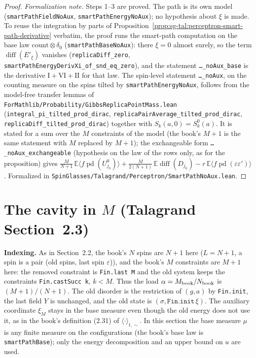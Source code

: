 \begin{proof}
\emph{Formalization note.} Steps 1--3 are proved. The path is its own model (\texttt{smartPathFieldNoAux},
\texttt{smartPathEnergyNoAux}); no hypothesis about $\xi$ is made. To reuse the integration by parts of
Proposition~\ref{prop:sg-tal:perceptron-smart-path-derivative} verbatim, the proof runs the smart-path computation on
the base law $\mathrm{count}\otimes\delta_0$ (\texttt{smartPathBaseNoAux}): there $\xi=0$ almost surely, so the term
$\operatorname{diff}(E'_\xi)$ vanishes (\texttt{replicaDiff\_zero}, \texttt{smartPathEnergyDerivXi\_of\_snd\_eq\_zero}),
and the statement \texttt{\ldots\_noAux\_base} is the derivative $\mathrm I+\mathrm{VI}+\mathrm{II}$ for that law. The
spin-level statement \texttt{\ldots\_noAux}, on the counting measure on the spins tilted by \texttt{smartPathEnergyNoAux}, follows
from the model-free transfer lemmas of \texttt{ForMathlib/Probability/GibbsReplicaPointMass.lean}
(\texttt{integral\_pi\_tilted\_prod\_dirac}, \texttt{replicaPairAverage\_tilted\_prod\_dirac},
\texttt{replicaDiff\_tilted\_prod\_dirac}) together with $S_k(a,0)=S^0_k(a)$. It is stated for a sum over the $M$ constraints
of the model (the book's $M+1$ is the same statement with $M$ replaced by $M+1$); the exchangeable form
\texttt{\ldots\_noAux\_exchangeable} (hypothesis on the law of the rows only, as for the proposition) gives
$\frac{M}{N+1}\,\mathbb E\langle f\operatorname{pd}(U^0_{j_0})\rangle+\frac{M}{2(N+1)}\,\mathbb E\operatorname{diff}(D_{j_0})-r\,\mathbb E\langle f\operatorname{pd}(\varepsilon\varepsilon')\rangle$.
Formalized in \texttt{SpinGlasses/Talagrand/Perceptron/SmartPathNoAux.lean}.
\end{proof}

\section{The cavity in $M$ (Talagrand Section~2.3)}\label{sec:sg-tal:perceptron-cavity-in-m}

\medskip\noindent\textbf{Indexing.} As in Section~2.2, the book's $N$ spins are $N+1$ here ($L=N+1$, a spin is a pair
(old spins, last spin $\varepsilon$)), and the book's $M$ constraints are $M+1$ here: the removed constraint is
\texttt{Fin.last M} and the old system keeps the constraints \texttt{Fin.castSucc k}, $k<M$. Thus the load
$\alpha=M_{\rm book}/N_{\rm book}$ is $(M+1)/(N+1)$. The old disorder is the restriction of $(g,a)$ by
\texttt{Fin.init}, the last field $Y$ is unchanged, and the old state is $(\sigma,\texttt{Fin.init}\,\xi)$. The auxiliary
coordinate $\xi_M$ stays in the base measure even though the old energy does not use it, as in the book's definition (2.31)
of $\langle\cdot\rangle_{t,\sim}$. In this section the base measure $\mu$ is any finite measure on the configurations
(the book's base law is \texttt{smartPathBase}); only the energy decomposition and an upper bound on $u$ are used.

